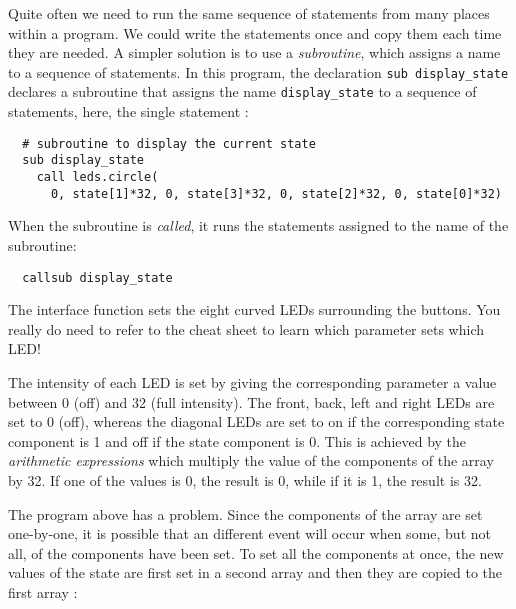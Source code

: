 \newpage


Quite often we need to run the same sequence of statements from many
places within a program. We could write the statements once and copy
them each time they are needed. A simpler solution is to use a
\emph{subroutine}, which assigns a name to a sequence of statements. In
this program, the declaration {\footnotesize\verb+sub display_state+}
declares a subroutine that assigns the name
{\footnotesize\verb+display_state+} to a sequence of statements, here,
the single statement :

\begin{footnotesize}
\begin{verbatim}
  # subroutine to display the current state
  sub display_state
    call leds.circle(
      0, state[1]*32, 0, state[3]*32, 0, state[2]*32, 0, state[0]*32)
\end{verbatim}
\end{footnotesize}

When the subroutine is \emph{called}, it runs the statements assigned to
the name of the subroutine:
\vspace{-1ex}
\begin{footnotesize}
\begin{verbatim}
  callsub display_state
\end{verbatim}
\end{footnotesize}
\vspace{-1ex}
The interface function  sets the eight curved LEDs
surrounding the buttons. You really do need to refer to the cheat sheet
to learn which parameter sets which LED!

The intensity of each LED is set by giving the corresponding parameter a
value between 0 (off) and 32 (full intensity). The front, back,
left and right LEDs are set to 0 (off), whereas the diagonal LEDs are
set to on if the corresponding state component is 1 and off if the state
component is 0. This is achieved by the \emph{arithmetic expressions}
 which multiply the value of the components of the array
by 32. If one of the values is 0, the result is 0, while if it is 1, the
result is 32.

\newpage


The program above has a problem. Since the components of the array
 are set one-by-one, it is possible that an different event
will occur when some, but not all, of the components have been set. To
set all the components at once, the new values of the state are first
set in a second array  and then they are copied to the
first array :

